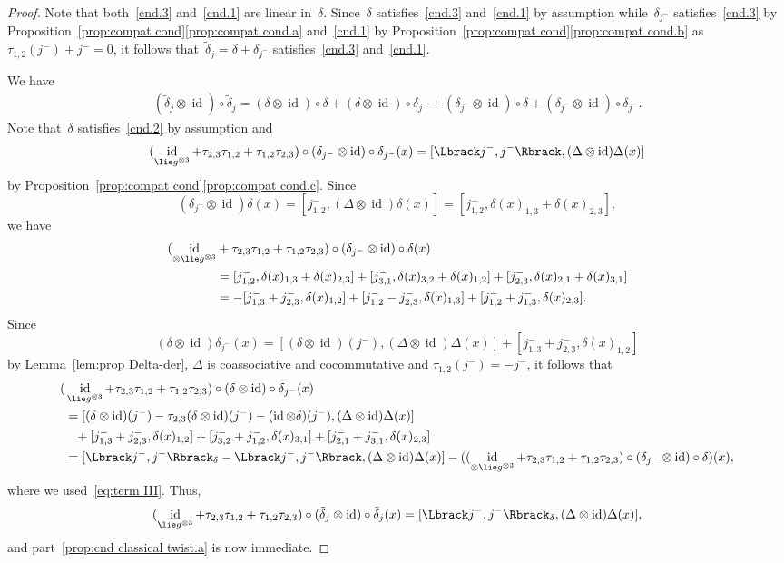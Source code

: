 \documentclass[12pt, reqno]{amsart}
\newcommand{\cybe}[1]{\mathbb{\Lbrack}#1,#1\mathbb{\Rbrack}}
\theoremstyle{definition}
\numberwithin{equation}{section}
\newcommand{\tensor}{\otimes}
\DeclareMathOperator{\id}{id}
\begin{document}
\begin{proof}
Note that both~\ref{cnd.3} and~\ref{cnd.1}
are linear in~$\delta$.
Since~$\delta$ satisfies~\ref{cnd.3} and~\ref{cnd.1} by assumption while~$\delta_{ j ^-}$ satisfies~\ref{cnd.3} by Proposition~\ref{prop:compat cond}\ref{prop:compat cond.a} and~\ref{cnd.1}
by Proposition~\ref{prop:compat cond}\ref{prop:compat cond.b} as~$\tau_{1,2}( j ^-)+ j ^-=0$, 
it follows 
that~$\tilde\delta_{ j }=\delta+\delta_{ j ^-}$ satisfies~\ref{cnd.3} and~\ref{cnd.1}.

We have 
\begin{align*}
(\tilde\delta_{ j }\tensor\id)\circ\tilde\delta_{ j }
=(\delta\tensor\id)\circ\delta 
+(\delta\tensor\id)\circ\delta_{ j ^-}
+(\delta_{ j ^-}\tensor\id)\circ\delta
+(\delta_{ j ^-}\tensor\id)\circ \delta_{ j ^-}.
\end{align*}
Note that~$\delta$ satisfies~\ref{cnd.2} by assumption and 
$$
(\id_{ \lie g^{\tensor 3}}+
\tau_{2,3}\tau_{1,2}+\tau_{1,2}\tau_{2,3})\circ 
(\delta_{ j ^-}\tensor \id)\circ \delta_{ j ^-}(x)=
[\cybe{ j ^-},(\Delta\tensor\id)\Delta(x)]
$$
by Proposition~\ref{prop:compat cond}\ref{prop:compat cond.c}. Since
$$
(\delta_{ j ^-}\tensor\id)\delta(x)=
[ j ^-_{1,2},(\Delta\tensor\id)\delta(x)]
=[ j ^-_{1,2},\delta(x)_{1,3}+\delta(x)_{2,3}],
$$
we have 
\begin{align}
(\id_{\tensor \lie g^{\tensor 3}}&+
\tau_{2,3}\tau_{1,2}+\tau_{1,2}\tau_{2,3})\circ(\delta_{ j ^-}\tensor\id)\circ \delta(x)\nonumber\\
&=[ j ^-_{1,2},\delta(x)_{1,3}+\delta(x)_{2,3}]+
[ j ^-_{3,1},\delta(x)_{3,2}+\delta(x)_{1,2}]
+[ j ^-_{2,3},\delta(x)_{2,1}+\delta(x)_{3,1}]\nonumber\\
&=-[ j ^-_{1,3}+ j ^-_{2,3},\delta(x)_{1,2}]+
[ j ^-_{1,2}- j ^-_{2,3},\delta(x)_{1,3}]
+[ j ^-_{1,2}+ j ^-_{1,3},\delta(x)_{2,3}].\label{eq:term III}
\end{align}
Since
$$
(\delta\tensor\id)\delta_{ j ^-}(x)=
[(\delta\tensor\id)( j ^-),(\Delta\tensor\id)\Delta(x)]+
[ j ^-_{1,3}+ j ^-_{2,3},\delta(x)_{1,2}]
$$
by Lemma~\ref{lem:prop Delta-der}, $\Delta$ is coassociative and cocommutative and $\tau_{1,2}( j ^-)=- j ^-$,
it follows that 
\begin{align*}
(&\id_{\lie g^{\tensor 3}}+
\tau_{2,3}\tau_{1,2}+\tau_{1,2}\tau_{2,3})\circ
(\delta\tensor\id)\circ \delta_{ j ^-}(x)\\
&=[(\delta\tensor\id)( j ^-)-\tau_{2,3}(\delta\tensor\id)( j ^-)-(\id\tensor\delta)( j ^-),(\Delta\tensor\id)\Delta(x)]\\
&\phantom{=}+[ j ^-_{1,3}+ j ^-_{2,3},\delta(x)_{1,2}]
+[ j ^-_{3,2}+ j ^-_{1,2},\delta(x)_{3,1}]
+[ j ^-_{2,1}+ j ^-_{3,1},\delta(x)_{2,3}]\\
&=[\cybe{ j ^-}_\delta-\cybe{ j ^-},(\Delta\tensor\id)\Delta(x)]-((\id_{\tensor \lie g^{\tensor 3}}+
\tau_{2,3}\tau_{1,2}+\tau_{1,2}\tau_{2,3})\circ(\delta_{ j ^-}\tensor\id)\circ\delta)(x),
\end{align*}
where we used~\eqref{eq:term III}. Thus,
$$
(\id_{\lie g^{\tensor 3}}+
\tau_{2,3}\tau_{1,2}+\tau_{1,2}\tau_{2,3})\circ(\tilde\delta_{ j }\tensor\id)\circ \tilde \delta_{ j }(x)=[ \cybe{ j ^-}_\delta,(\Delta\tensor\id)\Delta(x)],
$$
and part~\ref{prop:cnd classical twist.a} is now
immediate.


\end{proof}
\end{document}
